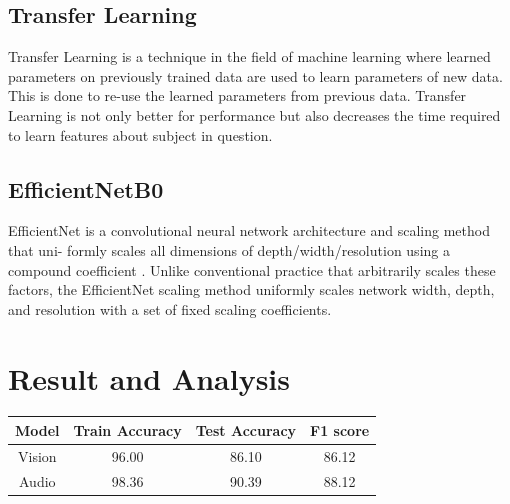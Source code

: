 \documentclass[fleqn, 10pt, twoside]{IOEGC}
\begin{document}
\subsection{Transfer Learning}
Transfer Learning is a technique in the field of machine learning where learned parameters on previously trained data are used to learn parameters of new data. This is done to re-use the learned parameters from previous data. Transfer Learning is not
only better for performance but also decreases the time required to learn features about
subject in question.

\subsection{EfficientNetB0}
EfficientNet is a convolutional neural network architecture and scaling method that uni-
formly scales all dimensions of depth/width/resolution using a compound coefficient \cite{r7}.
Unlike conventional practice that arbitrarily scales these factors, the EfficientNet scaling method uniformly scales network width, depth, and resolution with a set of fixed scaling
coefficients.
\par
\section{Result and Analysis}

\begin{center}
	\begin{tabular}{ |c|c|c|c| }
		\hline
		Model  & Train Accuracy & Test Accuracy & F1 score \\
		\hline
		Vision & 96.00          & 86.10         & 86.12    \\
		\hline
		Audio  & 98.36          & 90.39         & 88.12    \\

		\hline
	\end{tabular}

\end{center}
\end{document}
